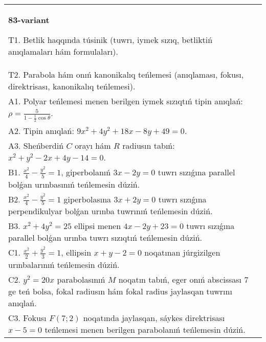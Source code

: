 \documentclass{article}
\begin{document}
\begin{tabular}{m{17cm}}
\textbf{83-variant}
\newline

T1. Betlik haqqında túsinik (tuwrı, iymek sızıq, betliktiń anıqlamaları hám formulaları).\\

T2. Parabola hám onıń kanonikalıq teńlemesi (anıqlaması, fokusı, direktrisası, kanonikalıq teńlemesi).\\

A1. Polyar teńlemesi menen berilgen iymek sızıqtıń tipin anıqlań: $\rho=\frac{5}{1-\frac{1}{2}\cos\theta}$.\\

A2. Tipin anıqlań: $9 x^{2}+4 y^{2}+18 x-8 y+49=0$.\\

A3. Sheńberdiń $C$ orayı hám $R$ radiusın tabıń: $x^2+y^2-2 x+4 y-14=0$.\\

B1. $\frac{x^{2}}{4} - \frac{y^{2}}{5} = 1$, giperbolanıń $3x - 2y = 0$ tuwrı sızıǵına parallel bolǵan urınbasınıń teńlemesin dúziń.  \\

B2. $\frac{x^{2}}{4} - \frac{y^{2}}{5} = 1$ giperbolasına $3x + 2y = 0$ tuwrı sızıǵına perpendikulyar bolǵan urınba tuwrınıń teńlemesin dúziń.\\

B3. $x^{2} + 4y^{2} = 25$ ellipsi menen $4x - 2y + 23 = 0$ tuwrı sızıǵına parallel bolǵan urınba tuwrı sızıqtıń teńlemesin dúziń.  \\

C1. $\frac{x^{2}}{2} + \frac{y^{2}}{3} = 1$, ellipsin $x + y - 2 = 0$ noqatınan júrgizilgen urınbalarınıń teńlemesin dúziń.  \\

C2. $y^{2} = 20x$ parabolasınıń $M$ noqatın tabıń, eger onıń abscissası 7 ge teń bolsa, fokal radiusın hám fokal radius jaylasqan tuwrını anıqlań.\\

C3. Fokusı $F(7;2)$ noqatında jaylasqan, sáykes direktrisası $x - 5 = 0$ teńlemesi menen berilgen parabolanıń teńlemesin dúziń.  \\

\end{tabular}
\vspace{1cm}
\end{document}
